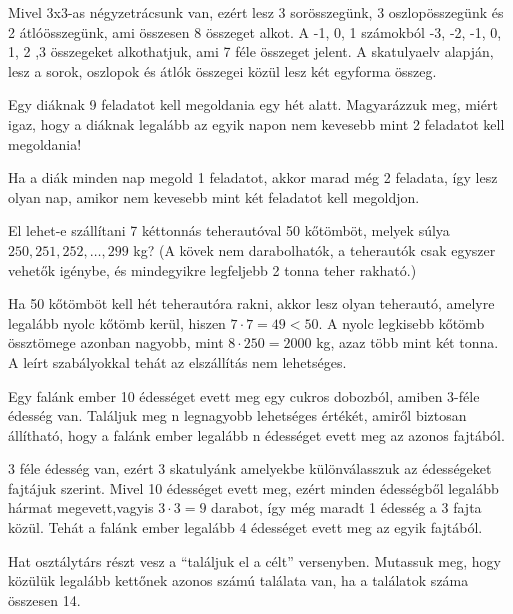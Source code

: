 \begin{solution}
	Mivel 3x3-as négyzetrácsunk van, ezért lesz 3 sorösszegünk, 3 oszlopösszegünk
	és 2 átlóösszegünk, ami összesen 8 összeget alkot. A -1, 0, 1 számokból
	-3, -2, -1, 0, 1, 2 ,3 összegeket alkothatjuk, ami 7 féle összeget
	jelent. A skatulyaelv alapján, lesz a sorok, oszlopok és átlók összegei
	közül lesz két egyforma összeg. 
\end{solution}
\begin{problem}
	Egy diáknak 9 feladatot kell megoldania egy hét alatt. Magyarázzuk
	meg, miért igaz, hogy a diáknak legalább az egyik napon nem kevesebb
	mint 2 feladatot kell megoldania! 
\end{problem}

\begin{solution}
	Ha a diák minden nap megold 1 feladatot, akkor marad még 2 feladata,
	így lesz olyan nap, amikor nem kevesebb mint két feladatot kell megoldjon. 
\end{solution}
\begin{problem}
	El lehet-e szállítani 7 kéttonnás teherautóval 50 kőtömböt, melyek
	súlya $250, 251, 252, \dots, 299$ kg? (A kövek nem darabolhatók, a
	teherautók csak egyszer vehetők igénybe, és mindegyikre legfeljebb
	2 tonna teher rakható.) \\
	
\end{problem}

\begin{solution}
	Ha 50 kőtömböt kell hét teherautóra rakni, akkor lesz olyan teherautó,
	amelyre legalább nyolc kőtömb kerül, hiszen $7\cdot7=49<50$. A nyolc
	legkisebb kőtömb össztömege azonban nagyobb, mint $8\cdot250=2000$
	kg, azaz több mint két tonna. A leírt szabályokkal tehát az elszállítás
	nem lehetséges. 
\end{solution}
\begin{problem}
	Egy falánk ember 10 édességet evett meg egy cukros dobozból, amiben
	3-féle édesség van. Találjuk meg n legnagyobb lehetséges értékét,
	amiről biztosan állítható, hogy a falánk ember legalább n édességet
	evett meg az azonos fajtából. \\
	
\end{problem}

\begin{solution}
	3 féle édesség van, ezért 3 skatulyánk amelyekbe különválasszuk az
	édességeket fajtájuk szerint. Mivel 10 édességet evett meg, ezért
	minden édességből legalább hármat megevett,vagyis $3\cdot3=9$ darabot,
	így még maradt 1 édesség a 3 fajta közül. Tehát a falánk ember legalább
	4 édességet evett meg az egyik fajtából. 
\end{solution}
\begin{problem}
	Hat osztálytárs részt vesz a “találjuk el a célt” versenyben. Mutassuk
	meg, hogy közülük legalább kettőnek azonos számú találata van, ha
	a találatok száma összesen 14. \\
	
\end{problem}

